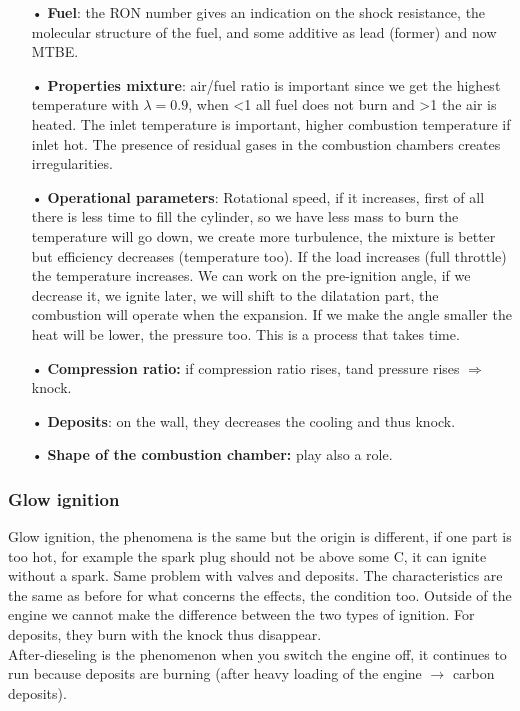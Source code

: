 	\begin{itemize}
	\item[•] \textbf{Fuel}: the RON number gives an indication on the shock resistance, the molecular structure of the fuel, and some additive as lead (former) and now MTBE. 
	\item[•] \textbf{Properties mixture}:  air/fuel ratio is important since we get the highest temperature with $\lambda = 0.9$, when <1 all fuel does not burn and >1 the air is heated. The inlet temperature is important, higher combustion temperature if inlet hot. The presence of residual gases in the combustion chambers creates irregularities. 
	\item[•] \textbf{Operational parameters}: Rotational speed, if it increases, first of all there is less time to fill the cylinder, so we have less mass to burn the temperature will go down, we create more turbulence, the mixture is better but efficiency decreases (temperature too). If the load increases (full throttle) the temperature increases. We can work on the pre-ignition angle, if we decrease it, we ignite later, we will shift to the dilatation part, the combustion will operate when the expansion. If we make the angle smaller the heat will be lower, the pressure too. This is a process that takes time. 
	\item[•] \textbf{Compression ratio:} if compression ratio rises, t\degres and pressure rises $\Rightarrow$ knock. 
	\item[•] \textbf{Deposits}: on the wall, they decreases the cooling and thus knock. 
	\item[•] \textbf{Shape of the combustion chamber:} play also a role. \\
	\end{itemize}
	
\subsubsection{Glow ignition}
	Glow ignition, the phenomena is the same but the origin is different, if one part is too hot, for example the spark plug should not be above some \degres C, it can ignite without a spark. Same problem with valves and deposits. The characteristics are the same as before for what concerns the effects, the condition too. Outside of the engine we cannot make the difference between the two types of ignition. For deposits, they burn with the knock thus disappear. \\
	
	After-dieseling is the phenomenon when you switch the engine off, it continues to run because deposits are burning (after heavy loading of the engine $\rightarrow$ carbon deposits). 
	
